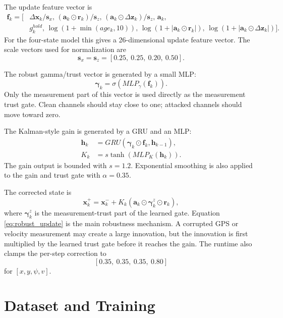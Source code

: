 \documentclass[11pt,a4paper]{article}
\newcommand{\state}{\bm{x}}
\newcommand{\meas}{\bm{z}}
\newcommand{\trust}{\bm{\gamma}}
\newcommand{\avail}{\bm{a}}
\newcommand{\innov}{\bm{r}}
\begin{document}
The update feature vector is
\begin{equation}
\begin{aligned}
  \bm{f}_k =
  [&\Delta\state_k / \bm{s}_x,\,
    (\avail_k \odot \innov_k) / \bm{s}_z,\,
    (\avail_k \odot \Delta\meas_k) / \bm{s}_z,\,
    \avail_k,\\
   &g^{hold}_k,\,
    \log(1+\min(age_k,10)),\,
    \log(1+|\avail_k\odot\innov_k|),\,
    \log(1+|\avail_k\odot\Delta\meas_k|)] .
\end{aligned}
\end{equation}
For the four-state model this gives a 26-dimensional update feature vector.
The scale vectors used for normalization are
\[
  \bm{s}_x=\bm{s}_z=[0.25,\ 0.25,\ 0.20,\ 0.50].
\]

The robust gamma/trust vector is generated by a small MLP:
\begin{equation}
  \trust_k = \sigma(MLP_{\gamma}(\bm{f}_k)).
\end{equation}
Only the measurement part of this vector is used directly as the measurement
trust gate. Clean channels should stay close to one; attacked channels should
move toward zero.

The Kalman-style gain is generated by a GRU and an MLP:
\begin{align}
  \bm{h}_k &= GRU(\trust_k \odot \bm{f}_k,\bm{h}_{k-1}), \\
  K_k &= s\tanh(MLP_K(\bm{h}_k)).
\end{align}
The gain output is bounded with $s=1.2$. Exponential smoothing is also applied
to the gain and trust gate with $\alpha=0.35$.

The corrected state is
\begin{equation}
  \state_k^+
  =
  \state_k^-
  +
  K_k
  \left(
    \avail_k \odot \trust_k^z \odot \innov_k
  \right),
  \label{eq:robust_update}
\end{equation}
where $\trust_k^z$ is the measurement-trust part of the learned gate. Equation
\eqref{eq:robust_update} is the main robustness mechanism. A corrupted GPS or
velocity measurement may create a large innovation, but the innovation is first
multiplied by the learned trust gate before it reaches the gain. The runtime
also clamps the per-step correction to
\[
  [0.35,\ 0.35,\ 0.35,\ 0.80]
\]
for $[x,y,\psi,v]$.

\section{Dataset and Training}
\end{document}
